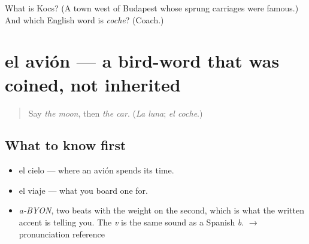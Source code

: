 \begin{tcolorbox}[breakable,colback=teal!4,colframe=teal!35!black,title={Before you move on}]
What is Kocs? (A town west of Budapest whose sprung carriages were famous.) And which English word is \emph{coche}? (Coach.)
\end{tcolorbox}
\section[el avión]{el avión — a bird-word that was coined, not inherited}

\label{lesson:ES-C363-avion}



\begin{quote}
Say \emph{the moon}, then \emph{the car}. (\emph{La luna}; \emph{el coche}.)
\end{quote}

\subsection*{What to know first}
\begin{itemize}
\raggedright
  \item el cielo — where an avión spends its time.
  \item el viaje — what you board one for.
\end{itemize}

\begin{sounds}
\begin{itemize}
\raggedright
  \item \emph{a-BYON}, two beats with the weight on the second, which is what the written accent is telling you. The \emph{v} is the same sound as a Spanish \emph{b}. $\to$ pronunciation reference
\end{itemize}
\end{sounds}

